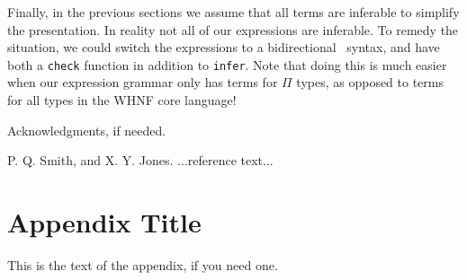 \documentclass[preprint,authoryear]{sigplanconf}
\begin{document}
Finally, in the previous sections we assume that all terms are
inferable to simplify the presentation. In reality not all of our expressions
are inferable. To remedy the situation, we could switch the
expressions to a bidirectional~\cite{TODO} syntax, and have both a \texttt{check}
function in addition to \texttt{infer}. Note that doing this is much
easier when our expression grammar only has terms for $\Pi$ types, as
opposed to terms for all types in the WHNF core language!

\acks

Acknowledgments, if needed.





\begin{thebibliography}{}
\softraggedright

P. Q. Smith, and X. Y. Jones. ...reference text...

\end{thebibliography}

\appendix
\section{Appendix Title}

This is the text of the appendix, if you need one.
\end{document}
